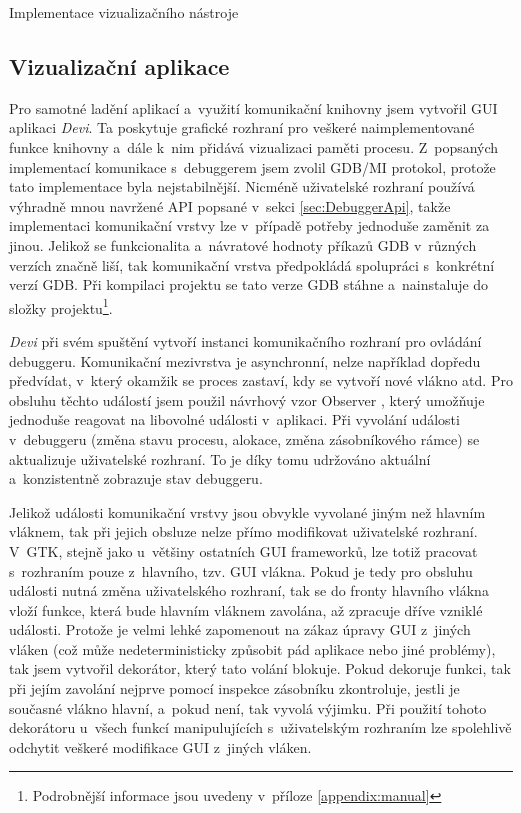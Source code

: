 \documentclass[czech,bachelor,male,python,dept460,hidelinks]{diploma}						%
\newcommand{\parspace}[1][]{
	\ifthenelse{\isempty{#1}}{\vspace{0mm}}{\vspace{#1}}
	\par
}
\begin{document}
\begin{section}{Implementace vizualizačního nástroje}
	\subsection{Vizualizační aplikace}
	Pro samotné ladění aplikací a~využití komunikační knihovny jsem vytvořil GUI aplikaci \textit{Devi}.
	Ta poskytuje grafické rozhraní pro veškeré naimplementované funkce knihovny a~dále k~nim přidává vizualizaci paměti procesu.
	Z~popsaných implementací komunikace s~debuggerem jsem zvolil GDB/MI protokol, protože tato implementace byla nejstabilnější.
	Nicméně uživatelské rozhraní používá výhradně mnou navržené API popsané v~sekci \ref{sec:DebuggerApi}, takže implementaci komunikační vrstvy
	lze v~případě potřeby jednoduše zaměnit za jinou. Jelikož se funkcionalita a~návratové hodnoty příkazů GDB v~různých verzích značně liší, tak komunikační vrstva
	předpokládá spolupráci s~konkrétní verzí GDB. Při kompilaci projektu se tato verze GDB stáhne a~nainstaluje do složky
	projektu\footnote{Podrobnější informace jsou uvedeny v~příloze \ref{appendix:manual}}.
	
	
	\parspace \textit{Devi} při svém spuštění vytvoří instanci komunikačního rozhraní pro ovládání debuggeru. Komunikační mezivrstva je asynchronní,
	nelze například dopředu předvídat, v~který okamžik se proces zastaví, kdy se vytvoří nové vlákno atd. Pro obsluhu těchto událostí jsem použil návrhový vzor
	Observer \cite[326]{gof}, který umožňuje jednoduše reagovat na libovolné události v~aplikaci. Při vyvolání události v~debuggeru (změna stavu procesu,
	alokace, změna zásobníkového rámce) se aktualizuje uživatelské rozhraní. To je díky tomu udržováno aktuální a~konzistentně zobrazuje
	stav debuggeru.
	
	\parspace Jelikož události komunikační vrstvy jsou obvykle vyvolané jiným než hlavním vláknem, tak při jejich obsluze nelze přímo modifikovat uživatelské
	rozhraní. V~GTK, stejně jako u~většiny ostatních GUI frameworků, lze totiž pracovat s~rozhraním pouze z~hlavního, tzv. GUI vlákna. Pokud je tedy pro
	obsluhu události nutná změna uživatelského rozhraní, tak se do fronty hlavního vlákna vloží funkce, která bude hlavním vláknem zavolána,
	až zpracuje dříve vzniklé události. Protože je velmi lehké zapomenout na zákaz úpravy GUI z~jiných vláken (což může nedeterministicky způsobit pád
	aplikace nebo jiné problémy), tak jsem vytvořil dekorátor, který tato volání blokuje. Pokud dekoruje funkci, tak při jejím zavolání
	nejprve pomocí inspekce zásobníku zkontroluje, jestli je současné vlákno hlavní, a~pokud není, tak vyvolá výjimku. Při použití tohoto dekorátoru u~všech
	funkcí manipulujících s~uživatelským rozhraním lze spolehlivě odchytit veškeré modifikace GUI z~jiných vláken.
	

\end{section}
\end{document}
